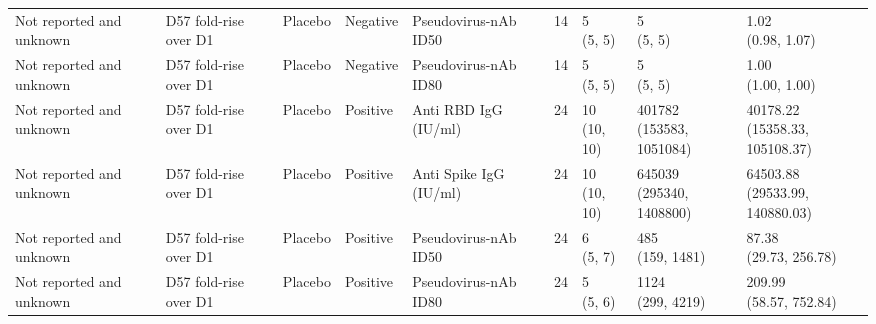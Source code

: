 \documentclass[]{book}
\theoremstyle{definition}
\theoremstyle{definition}
\theoremstyle{definition}
\newcommand{\1}{\mathbbm{1}}
\begin{document}
\begin{landscape}
\begin{ThreePartTable}
\begin{longtable}[t]{>{\raggedright\arraybackslash}p{2.7cm}llllllll}
\hspace{1em}Not reported and unknown & D57 fold-rise over D1 & Placebo & Negative & Pseudovirus-nAb ID50 & 14 & \makecell[l]{5\\(5, 5)} & \makecell[l]{5\\(5, 5)} & \makecell[l]{1.02\\(0.98, 1.07)}\\
\hspace{1em}Not reported and unknown & D57 fold-rise over D1 & Placebo & Negative & Pseudovirus-nAb ID80 & 14 & \makecell[l]{5\\(5, 5)} & \makecell[l]{5\\(5, 5)} & \makecell[l]{1.00\\(1.00, 1.00)}\\
\hspace{1em}Not reported and unknown & D57 fold-rise over D1 & Placebo & Positive & Anti RBD IgG (IU/ml) & 24 & \makecell[l]{10\\(10, 10)} & \makecell[l]{401782\\(153583, 1051084)} & \makecell[l]{40178.22\\(15358.33, 105108.37)}\\
\hspace{1em}Not reported and unknown & D57 fold-rise over D1 & Placebo & Positive & Anti Spike IgG (IU/ml) & 24 & \makecell[l]{10\\(10, 10)} & \makecell[l]{645039\\(295340, 1408800)} & \makecell[l]{64503.88\\(29533.99, 140880.03)}\\
\hspace{1em}Not reported and unknown & D57 fold-rise over D1 & Placebo & Positive & Pseudovirus-nAb ID50 & 24 & \makecell[l]{6\\(5, 7)} & \makecell[l]{485\\(159, 1481)} & \makecell[l]{87.38\\(29.73, 256.78)}\\
\hspace{1em}Not reported and unknown & D57 fold-rise over D1 & Placebo & Positive & Pseudovirus-nAb ID80 & 24 & \makecell[l]{5\\(5, 6)} & \makecell[l]{1124\\(299, 4219)} & \makecell[l]{209.99\\(58.57, 752.84)}\\*
\end{longtable}
\end{ThreePartTable}



\end{landscape}
\end{document}
